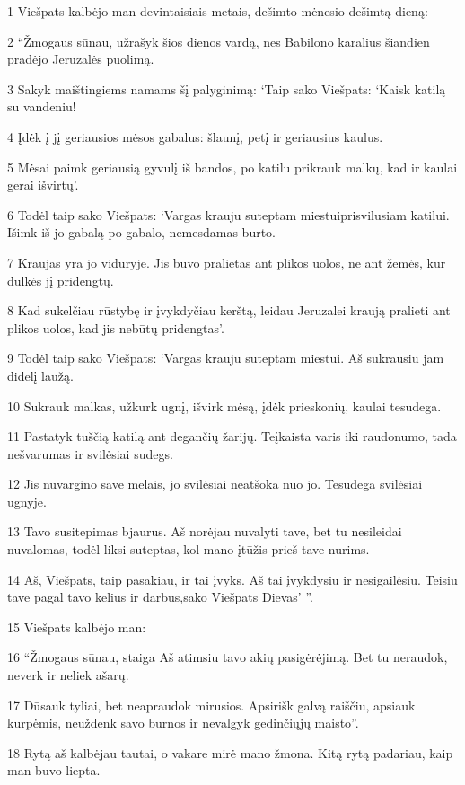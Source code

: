 \par 1 Viešpats kalbėjo man devintaisiais metais, dešimto mėnesio dešimtą dieną: 
\par 2 “Žmogaus sūnau, užrašyk šios dienos vardą, nes Babilono karalius šiandien pradėjo Jeruzalės puolimą. 
\par 3 Sakyk maištingiems namams šį palyginimą: ‘Taip sako Viešpats: ‘Kaisk katilą su vandeniu! 
\par 4 Įdėk į jį geriausios mėsos gabalus: šlaunį, petį ir geriausius kaulus. 
\par 5 Mėsai paimk geriausią gyvulį iš bandos, po katilu prikrauk malkų, kad ir kaulai gerai išvirtų’. 
\par 6 Todėl taip sako Viešpats: ‘Vargas krauju suteptam miestui­prisvilusiam katilui. Išimk iš jo gabalą po gabalo, nemesdamas burto. 
\par 7 Kraujas yra jo viduryje. Jis buvo pralietas ant plikos uolos, ne ant žemės, kur dulkės jį pridengtų. 
\par 8 Kad sukelčiau rūstybę ir įvykdyčiau kerštą, leidau Jeruzalei kraują pralieti ant plikos uolos, kad jis nebūtų pridengtas’. 
\par 9 Todėl taip sako Viešpats: ‘Vargas krauju suteptam miestui. Aš sukrausiu jam didelį laužą. 
\par 10 Sukrauk malkas, užkurk ugnį, išvirk mėsą, įdėk prieskonių, kaulai tesudega. 
\par 11 Pastatyk tuščią katilą ant degančių žarijų. Teįkaista varis iki raudonumo, tada nešvarumas ir svilėsiai sudegs. 
\par 12 Jis nuvargino save melais, jo svilėsiai neatšoka nuo jo. Tesudega svilėsiai ugnyje. 
\par 13 Tavo susitepimas bjaurus. Aš norėjau nuvalyti tave, bet tu nesileidai nuvalomas, todėl liksi suteptas, kol mano įtūžis prieš tave nurims. 
\par 14 Aš, Viešpats, taip pasakiau, ir tai įvyks. Aš tai įvykdysiu ir nesigailėsiu. Teisiu tave pagal tavo kelius ir darbus,­sako Viešpats Dievas’ ”. 
\par 15 Viešpats kalbėjo man: 
\par 16 “Žmogaus sūnau, staiga Aš atimsiu tavo akių pasigėrėjimą. Bet tu neraudok, neverk ir neliek ašarų. 
\par 17 Dūsauk tyliai, bet neapraudok mirusios. Apsirišk galvą raiščiu, apsiauk kurpėmis, neuždenk savo burnos ir nevalgyk gedinčiųjų maisto”. 
\par 18 Rytą aš kalbėjau tautai, o vakare mirė mano žmona. Kitą rytą padariau, kaip man buvo liepta. 
